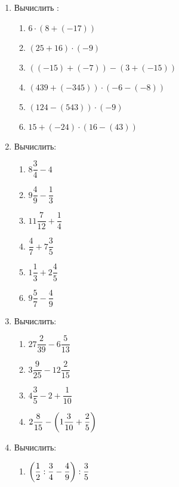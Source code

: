 \documentclass[12pt, a4paper]{article}
\begin{document}
	
 \cfoot{}
\begin{enumerate}
	\item Вычислить :
	\begin{multicols}{2}
		\begin{enumerate}[label=\textbf{\arabic*)}]
			\item $6\cdot(8+(-17))$
			\item $(25+16)\cdot(-9)$
			\item $((-15)+(-7))-(3+(-15))$
			\item $(439+(-345))\cdot(-6-(-8))$
			\item $(124-(543))\cdot(-9)$
			\item $15+(-24)\cdot(16-(43))$
		\end{enumerate}
	\end{multicols}
	\item Вычислить:
	\begin{multicols}{2}
		\begin{enumerate}[label=\textbf{\arabic*)}]
			\item \( 8\dfrac{3}{4}-4 \)
			\item \( 9\dfrac{4}{9}-\dfrac{1}{3} \)
			\item \( 11\dfrac{7}{12}+\dfrac{1}{4} \)
			\item \( \dfrac{4}{7}+7\dfrac{3}{5} \)
			\item \( 1\dfrac{1}{3}+2\dfrac{4}{5} \)
			\item \( 9\dfrac{5}{7}-\dfrac{4}{9} \)
		\end{enumerate}
	\end{multicols}
	\item Вычислить:
	\begin{multicols}{2}
		\begin{enumerate}[label=\textbf{\arabic*)}]
			\item \( 27\dfrac{2}{39}-6\dfrac{5}{13} \)
			\item \( 3\dfrac{9}{25}-12\dfrac{2}{15} \)
			\item \( 4\dfrac{3}{5}-2+\dfrac{1}{10} \)
			\item \( 2\dfrac{8}{15}-\left(1\dfrac{3}{10}+\dfrac{2}{5}\right) \)
		\end{enumerate}
	\end{multicols}
	\item Вычислить:
	\begin{multicols}{2}
		\begin{enumerate}[label=\textbf{\arabic*)}]
			\item \( \left(\dfrac{1}{2}:\dfrac{3}{4}-\dfrac{4}{9}\right):\dfrac{3}{5} \)

\end{enumerate}
\end{multicols}
\end{enumerate}
\end{document}
